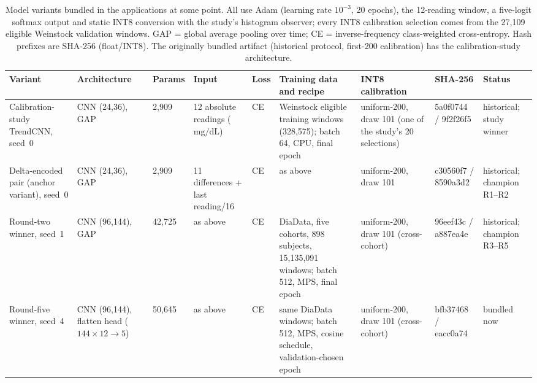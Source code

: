 \documentclass[10pt,twocolumn]{article}
\newcommand{\mgdl}{\ensuremath{\mathrm{mg/dL}}}
\begin{document}
\begin{table}[!tp]
\centering
\caption{Model variants bundled in the applications at some point. All
use Adam (learning rate $10^{-3}$, 20 epochs), the 12-reading window, a
five-logit softmax output and static INT8 conversion with the study's
histogram observer; every INT8 calibration selection comes from the
27,109 eligible Weinstock validation windows. GAP = global average
pooling over time; CE = inverse-frequency class-weighted cross-entropy.
Hash prefixes are SHA-256 (float/INT8). The originally bundled artifact
(historical protocol, first-200 calibration) has the calibration-study
architecture.}
\label{tab:variants}
\raggedcells
\footnotesize
\setlength{\tabcolsep}{3pt}
\begin{tabular}{@{}p{2.0cm}p{2.15cm}p{1.0cm}p{1.9cm}p{0.75cm}p{3.35cm}p{1.9cm}p{1.45cm}p{1.6cm}@{}}
\toprule
Variant & Architecture & Params & Input & Loss & Training data and recipe & INT8 calibration & SHA-256 & Status \\
\midrule
Calibration-study TrendCNN, seed~0 & CNN (24,36), GAP & 2,909 & 12 absolute readings (\mgdl) & CE & Weinstock eligible training windows (328,575); batch 64, CPU, final epoch & uniform-200, draw 101 (one of the study's 20 selections) & 5a0f0744 / 9f2f26f5 & historical; study winner \\
Delta-encoded pair (anchor variant), seed~0 & CNN (24,36), GAP & 2,909 & 11 differences + last reading/16 & CE & as above & uniform-200, draw 101 & c30560f7 / 8590a3d2 & historical; champion R1--R2 \\
Round-two winner, seed~1 & CNN (96,144), GAP & 42,725 & as above & CE & DiaData, five cohorts, 898 subjects, 15,135,091 windows; batch 512, MPS, final epoch & uniform-200, draw 101 (cross-cohort) & 96eef43c / a887ea4e & historical; champion R3--R5 \\
Round-five winner, seed~4 & CNN (96,144), flatten head ($144\times12\to5$) & 50,645 & as above & CE & same DiaData windows; batch 512, MPS, cosine schedule, validation-chosen epoch & uniform-200, draw 101 (cross-cohort) & bfb37468 / eacc0a74 & bundled now \\
\bottomrule
\end{tabular}
\end{table}
\end{document}
